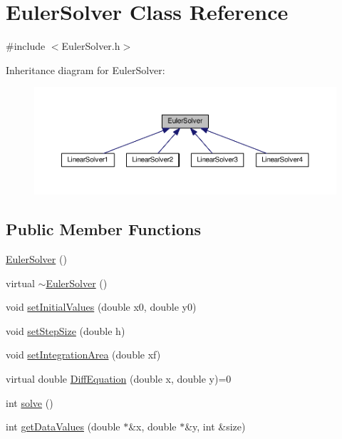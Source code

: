 \hypertarget{classEulerSolver}{}\section{Euler\+Solver Class Reference}
\label{classEulerSolver}


{\ttfamily \#include $<$Euler\+Solver.\+h$>$}



Inheritance diagram for Euler\+Solver\+:\nopagebreak
\begin{figure}[H]
\begin{center}
\leavevmode
\includegraphics[width=350pt]{classEulerSolver__inherit__graph}
\end{center}
\end{figure}
\subsection*{Public Member Functions}
\begin{DoxyCompactItemize}
\item 
\hyperlink{classEulerSolver_a26e2d701b39e11176f147f7fe1d89e23}{Euler\+Solver} ()
\item 
virtual \hyperlink{classEulerSolver_ace90b1bc9a43703443e4caf7bf8f776d}{$\sim$\+Euler\+Solver} ()
\item 
void \hyperlink{classEulerSolver_af01d1179960dd710d670f4563633d12f}{set\+Initial\+Values} (double x0, double y0)
\item 
void \hyperlink{classEulerSolver_a58dbaa813c99143b7d1ba5c015135ed5}{set\+Step\+Size} (double h)
\item 
void \hyperlink{classEulerSolver_a85cb0e2f75a74a0999eeb5d5ca1a12e0}{set\+Integration\+Area} (double xf)
\item 
virtual double \hyperlink{classEulerSolver_ab9598d6adf761740607806988575ca0f}{Diff\+Equation} (double x, double y)=0
\item 
int \hyperlink{classEulerSolver_ab017374433f11690acb655a5d1d53a34}{solve} ()
\item 
int \hyperlink{classEulerSolver_aa7b5c95e6564dacb546833f3d8dd89d6}{get\+Data\+Values} (double $\ast$\&x, double $\ast$\&y, int \&size)
\end{DoxyCompactItemize}
